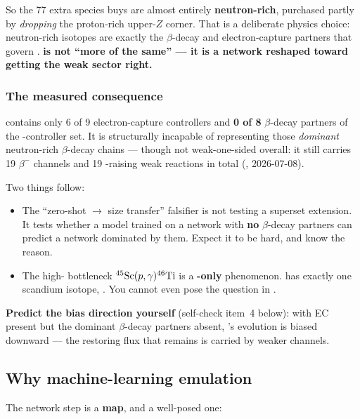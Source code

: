 So the 77 extra species  buys are almost entirely
\textbf{neutron-rich}, purchased partly by \emph{dropping} the proton-rich
upper-$Z$ corner. That is a deliberate physics choice: neutron-rich isotopes are
exactly the $\beta$-decay and electron-capture partners that govern \Ye{}.
\textbf{ is not ``more of the same'' --- it is a network reshaped
toward getting the weak sector right.}

\subsubsection{The measured consequence}
\label{sec:measuredconsequence}

 contains only 6 of 9 electron-capture controllers and \textbf{0 of 8}
$\beta$-decay partners of the \Ye{}-controller set. It is structurally incapable
of representing those \emph{dominant} neutron-rich $\beta$-decay chains ---
though not weak-one-sided overall: it still carries 19 $\beta^-$ channels and 19
\Ye{}-raising weak reactions in total (, 2026-07-08).

Two things follow:

\begin{itemize}
\item The ``zero-shot  $\to$  size transfer'' falsifier is not
      testing a superset extension. It tests whether a model trained on a
      network with \textbf{no} $\beta$-decay partners can predict a network
      dominated by them. Expect it to be hard, and know the reason.
\item The high-\Ye{} bottleneck $\nuc{Sc}{45}(p,\gamma)\nuc{Ti}{46}$ is a
      \textbf{-only} phenomenon.  has exactly one scandium
      isotope, . You cannot even pose the question in .
\end{itemize}

\textbf{Predict the bias direction yourself} (self-check item~4 below): with EC
present but the dominant $\beta$-decay partners absent, 's \Ye{}
evolution is biased downward --- the restoring flux that remains is carried by
weaker channels.

\subsection{Why machine-learning emulation}
\label{sec:whyml}

The network step is a \textbf{map}, and a well-posed one:

